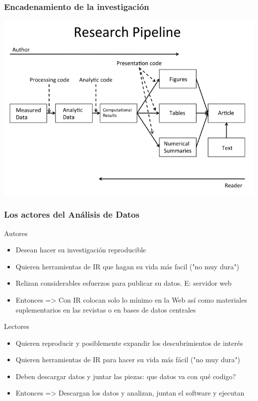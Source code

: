 \documentclass[sans serif,9pt,xcolor=dvipsnames]{beamer}%
\begin{document}
\begin{frame}
\frametitle{Encadenamiento de la investigación}
\justifying
\begin{center}
\includegraphics[scale=0.35]{imagenes/research_flow.png}
\end{center}
\end{frame}

\begin{frame}
\frametitle{Los actores del Análisis de Datos}
\justifying
\begin{block}{Autores} 
\begin{itemize}
  \item Desean hacer su investigación reproducible
  \item Quieren herramientas de IR que hagan su vida más facil ("no muy dura")
  \item Relizan considerables esfuerzos para publicar su datos. E: servidor web
  \item Entonces => Con IR colocan solo lo mínimo en la Web así como materiales suplementarios en las revistas o en bases de datos centrales
\end{itemize}
\end{block}
\begin{block}{Lectores} 
\begin{itemize}
  \item Quieren reproducir y posiblemente expandir los descubrimientos de interés
  \item Quieren herramientas de IR para hacer su vida más fácil ("no muy dura")
  \item Deben descargar datos y juntar las piezas: que datos va con qué codigo?
  \item Entonces => Descargan los datos y analizan, juntan el software y ejecutan
\end{itemize}
\end{block}
\end{frame}
\end{document}
